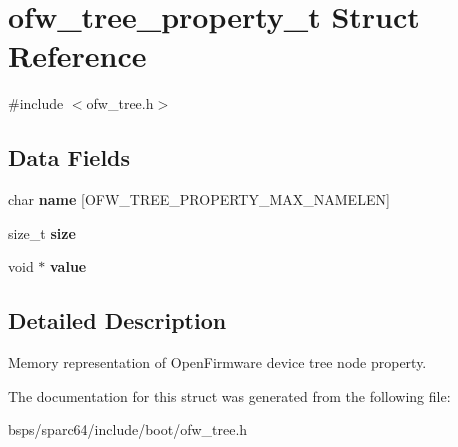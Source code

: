 \hypertarget{structofw__tree__property__t}{}\section{ofw\+\_\+tree\+\_\+property\+\_\+t Struct Reference}
\label{structofw__tree__property__t}


{\ttfamily \#include $<$ofw\+\_\+tree.\+h$>$}

\subsection*{Data Fields}
\begin{DoxyCompactItemize}
\item 
\mbox{\label{structofw__tree__property__t_a03f8caf6b80d1379636f629982a22d60}} 
char {\bfseries name} \mbox{[}O\+F\+W\+\_\+\+T\+R\+E\+E\+\_\+\+P\+R\+O\+P\+E\+R\+T\+Y\+\_\+\+M\+A\+X\+\_\+\+N\+A\+M\+E\+L\+EN\mbox{]}
\item 
\mbox{\label{structofw__tree__property__t_a42dca76fdc628ce41218895d48cd0e07}} 
size\+\_\+t {\bfseries size}
\item 
\mbox{\label{structofw__tree__property__t_a4ccea5c8570d5604b80bc15e44c1d1ae}} 
void $\ast$ {\bfseries value}
\end{DoxyCompactItemize}


\subsection{Detailed Description}
Memory representation of Open\+Firmware device tree node property. 

The documentation for this struct was generated from the following file\+:\begin{DoxyCompactItemize}
\item 
bsps/sparc64/include/boot/ofw\+\_\+tree.\+h\end{DoxyCompactItemize}
